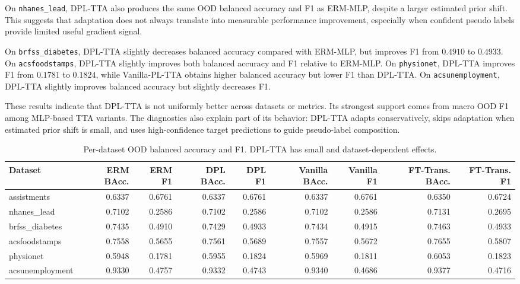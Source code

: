 On \texttt{nhanes\_lead}, DPL-TTA also produces the same OOD balanced accuracy and F1 as ERM-MLP, despite a larger estimated prior shift. This suggests that adaptation does not always translate into measurable performance improvement, especially when confident pseudo labels provide limited useful gradient signal.

On \texttt{brfss\_diabetes}, DPL-TTA slightly decreases balanced accuracy compared with ERM-MLP, but improves F1 from $0.4910$ to $0.4933$. On \texttt{acsfoodstamps}, DPL-TTA slightly improves both balanced accuracy and F1 relative to ERM-MLP. On \texttt{physionet}, DPL-TTA improves F1 from $0.1781$ to $0.1824$, while Vanilla-PL-TTA obtains higher balanced accuracy but lower F1 than DPL-TTA. On \texttt{acsunemployment}, DPL-TTA slightly improves balanced accuracy but slightly decreases F1.

These results indicate that DPL-TTA is not uniformly better across datasets or metrics. Its strongest support comes from macro OOD F1 among MLP-based TTA variants. The diagnostics also explain part of its behavior: DPL-TTA adapts conservatively, skips adaptation when estimated prior shift is small, and uses high-confidence target predictions to guide pseudo-label composition.

\begin{table}[t]
\centering
\caption{Per-dataset OOD balanced accuracy and F1. DPL-TTA has small and dataset-dependent effects.}
\label{tab:per_dataset}
\begin{tabular}{lrrrrrrrr}
\toprule
Dataset
& ERM BAcc. & ERM F1
& DPL BAcc. & DPL F1
& Vanilla BAcc. & Vanilla F1
& FT-Trans. BAcc. & FT-Trans. F1 \\
\midrule
assistments     & 0.6337 & 0.6761 & 0.6337 & 0.6761 & 0.6337 & 0.6761 & 0.6350 & 0.6724 \\
nhanes\_lead    & 0.7102 & 0.2586 & 0.7102 & 0.2586 & 0.7102 & 0.2586 & 0.7131 & 0.2695 \\
brfss\_diabetes & 0.7435 & 0.4910 & 0.7429 & 0.4933 & 0.7434 & 0.4915 & 0.7463 & 0.4933 \\
acsfoodstamps   & 0.7558 & 0.5655 & 0.7561 & 0.5689 & 0.7557 & 0.5672 & 0.7655 & 0.5807 \\
physionet       & 0.5948 & 0.1781 & 0.5955 & 0.1824 & 0.5969 & 0.1811 & 0.6053 & 0.1823 \\
acsunemployment & 0.9330 & 0.4757 & 0.9332 & 0.4743 & 0.9340 & 0.4686 & 0.9377 & 0.4716 \\
\bottomrule
\end{tabular}
\end{table}


